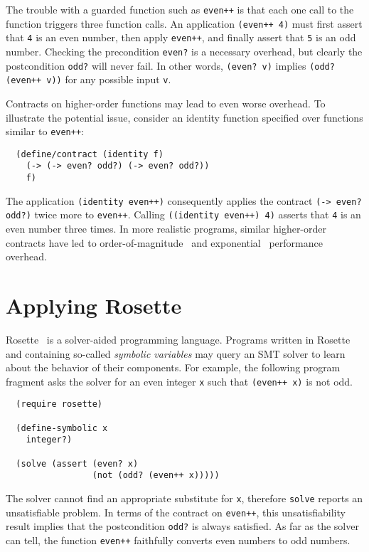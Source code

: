 \documentclass[nocopyrightspace,preprint,9pt]{sigplanconf}
\begin{document}
The trouble with a guarded function such as {\tt even++} is that each one call to the function triggers three function calls.
An application {\tt (even++ 4)} must first assert that {\tt 4} is an even number, then apply {\tt even++}, and finally assert that {\tt 5} is an odd number.
Checking the precondition {\tt even?} is a necessary overhead, but clearly the postcondition {\tt odd?} will never fail.
In other words, {\tt (even? v)} implies {\tt (odd? (even++ v))} for any possible input {\tt v}.

Contracts on higher-order functions may lead to even worse overhead.
To illustrate the potential issue, consider an identity function specified over functions similar to {\tt even++}:

\begin{verbatim}
  (define/contract (identity f)
    (-> (-> even? odd?) (-> even? odd?))
    f)
\end{verbatim}

The application {\tt (identity even++)} consequently applies the contract {\tt (-> even? odd?)} twice more to {\tt even++}.
Calling {\tt ((identity even++) 4)} asserts that {\tt 4} is an even number three times.
In more realistic programs, similar higher-order contracts have led to order-of-magnitude~\cite{tfgnfv-popl-2016} and exponential~\cite{tfdfftf-ecoop-2015} performance overhead.


\section{Applying Rosette}

Rosette~\cite{tb-pldi-2014} is a solver-aided programming language. %
Programs written in Rosette and containing so-called \emph{symbolic variables} may query an SMT solver to learn about the behavior of their components.
For example, the following program fragment asks the solver for an even integer {\tt x} such that {\tt (even++ x)} is not odd.

\begin{verbatim}
  (require rosette)

  (define-symbolic x
    integer?)

  (solve (assert (even? x)
                 (not (odd? (even++ x)))))
\end{verbatim}

\noindent The solver cannot find an appropriate substitute for {\tt x}, therefore {\tt solve} reports an unsatisfiable problem.
In terms of the contract on {\tt even++}, this unsatisfiability result implies that the postcondition {\tt odd?} is always satisfied.
As far as the solver can tell, the function {\tt even++} faithfully converts even numbers to odd numbers.
\end{document}
